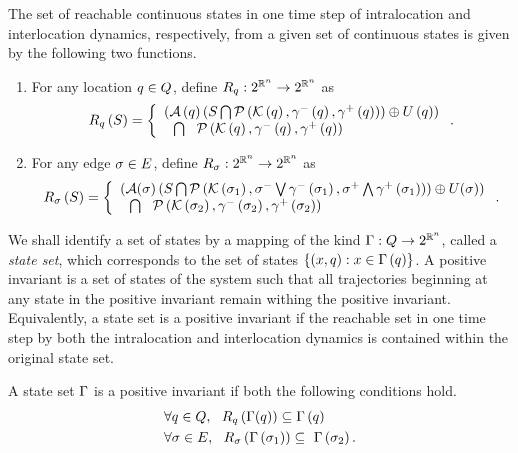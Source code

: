 The set of reachable continuous states in one time step of
intralocation and interlocation dynamics, respectively, from a given
set of continuous states is given by the following two functions.
\begin{enumerate}
\item For any location $q\in Q$, define $R_{q}:2^{\mathbb{R}^n}\rightarrow 2^{\mathbb{R}^n}$ as
\begin{equation*}
R_{q}\left(S\right) = \left\{\begin{array}{l}{\left(\mathcal{A}\left(q\right)\left(S\bigcap\mathcal{P}\left(\mathcal{K}\left(q\right),\gamma^-\left(q\right),\gamma^+\left(q\right)\right)\right)\oplus
U\left(q\right)\right)}\\{~~\bigcap~~\mathcal{P}\left(\mathcal{K}\left(q\right),\gamma^-\left(q\right),\gamma^+\left(q\right)\right)} \end{array}\right..
\end{equation*}
\item For any edge $\sigma\in E$, define
  $R_{\sigma}:2^{\mathbb{R}^n}\rightarrow 2^{\mathbb{R}^n}$ as
\begin{multline*}
R_{\sigma}\left(S\right) =  \left\{\begin{array}{l}{\left(\mathcal{A}(\sigma)\left(S\bigcap
\mathcal{P}\left(\mathcal{K}\left(\sigma_{1}\right),\sigma^-\bigvee\gamma^-\left(\sigma_{1}\right),\sigma^+\bigwedge\gamma^+\left(\sigma_{1}\right)\right)\right)\oplus U(\sigma)\right)}\\{~~\bigcap~~\mathcal{P}\left(\mathcal{K}\left(\sigma_{2}\right),\gamma^-\left(\sigma_{2}\right),\gamma^+\left(\sigma_{2}\right)\right)} \end{array}\right..
\end{multline*}
\end{enumerate}

We shall identify a set of states by a mapping of the kind
$\Gamma:Q\rightarrow 2^{\mathbb{R}^n}$, called a \emph{state
  set}, which corresponds to the set of states
$\left\{\left(x,q\right):x\in\Gamma\left(q\right)\right\}$.  A positive
invariant is a set of states of the system such that all trajectories
beginning at any state in the positive invariant remain withing the
positive invariant.  Equivalently, a state set is a positive invariant
if the reachable set in one time step by both the intralocation and
interlocation dynamics is contained within the original state set.
\begin{definition}
A state set $\Gamma$ is a positive invariant if
both the following conditions hold.
\begin{align}
& \forall q\in Q,~~R_{q}\left(\Gamma(q)\right) \subseteq \Gamma\left(q\right)~\label{eqn:pi1}\\
& \forall\sigma\in E,~~R_{\sigma}\left(\Gamma\left(\sigma_{1}\right)\right) \subseteq~\label{eqn:pi2}
  \Gamma\left(\sigma_{2}\right).
\end{align}
\end{definition}
